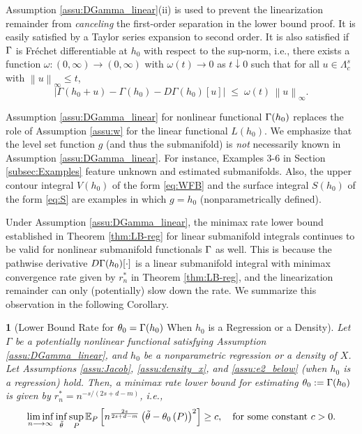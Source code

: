 \documentclass[12pt,american]{article}
\theoremstyle{definition}
\theoremstyle{plain}
\theoremstyle{definition}
\theoremstyle{plain}
\theoremstyle{plain}
\theoremstyle{plain}
\newtheorem{cor}{\protect\corollaryname}
\theoremstyle{plain}
\theoremstyle{plain}
\newcommand{\E}{\mathbb{E}}
\newcommand{\norm}[1]{\left\| #1 \right\|}
\newcommand{\abs}[1]{\left| #1 \right|}
\providecommand{\corollaryname}{Corollary}
\begin{document}
Assumption \ref{assu:DGamma_linear}(ii) is used to prevent the linearization remainder from \emph{canceling} the first-order separation in the lower bound proof. It is easily satisfied by a Taylor series expansion to second order. It is also satisfied if $\Gamma$ is Fr\'echet differentiable at $h_0$ with respect to the sup-norm, i.e., there exists a function $\omega:(0,\infty)\to(0,\infty)$ with $\omega(t)\to 0$ as $t\downarrow 0$
such that for all $u\in\Lambda^s_c$ with $\norm{u}_\infty\le t$,
\[
  \abs{\Gamma(h_0+u)-\Gamma(h_0)-D\Gamma(h_0)[u]}
  \;\le\; \omega(t)\,\norm{u}_\infty.
\]

Assumption \ref{assu:DGamma_linear} for nonlinear functional $\Gamma(h_0)$ replaces the role of Assumption \ref{assu:w} for the linear functional $L(h_0)$. We emphasize that the level set function $g$ (and thus the submanifold) is \emph{not} necessarily known in Assumption \ref{assu:DGamma_linear}. For instance, Examples 3-6 in Section \ref{subsec:Examples} feature unknown and estimated submanifolds. Also, the upper contour integral $V(h_0)$ of the form \eqref{eq:WFB} and the surface integral $S(h_0)$ of the form \eqref{eq:S} are examples in which $g=h_0$ (nonparametrically defined).

Under Assumption \ref{assu:DGamma_linear}, the minimax rate lower bound established in Theorem \ref{thm:LB-reg} for linear submanifold integrals continues to be valid for nonlinear submanifold functionals $\Gamma$ as well. This is because the pathwise derivative $D\Gamma(h_0)[\cdot]$ is a linear submanifold integral with minimax convergence rate given by $r^*_n$ in Theorem \ref{thm:LB-reg}, and the linearization remainder can only (potentially) slow down the rate. We summarize this observation in the following Corollary.

\begin{cor}[Lower Bound Rate for $\theta_0=\Gamma(h_0)$ When $h_0$ is a Regression or a Density]\label{cor:NL_rate_LB}
  Let $\Gamma$ be a potentially nonlinear functional satisfying Assumption \ref{assu:DGamma_linear}, and $h_0$ be a nonparametric regression or a density of $X$. Let Assumptions \ref{assu:Jacob}, \ref{assu:density_x}, and \ref{assu:e2_below} (when $h_0$ is a regression) hold.
  Then, a minimax rate lower bound for estimating $\theta_0:=\Gamma(h_0)$ is given by $r^*_n = n^{-s/(2s + d - m)}$, i.e.,
  \[
    \liminf_{n\longrightarrow\infty}\inf_{\tilde{\t}}\sup_{P}\E_{P}\left[n^{\frac{2s}{2s+d-m}}\left(\tilde{\t}-\t_{0}\left(P\right)\right)^{2}\right]\geq c,\quad\text{for some constant }c>0.
  \]
\end{cor}
\end{document}

